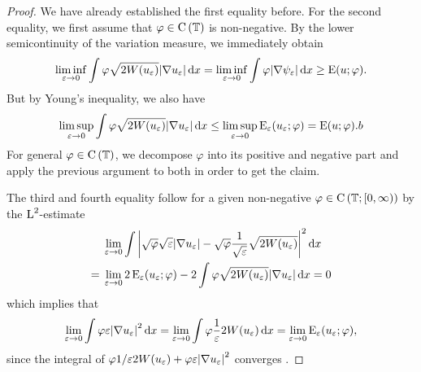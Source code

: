 \begin{proof}
	We have already established the first equality before. For the second 
	equality, we first assume that $ \varphi \in \operatorname{C} \left( \operatorname{\mathbb{T}}  
	\right) $ is non-negative.
	By the lower semicontinuity of the variation measure, we immediately obtain
	\begin{equation*}
		\liminf_{ \varepsilon \to 0 }
		\int
		\varphi
		\sqrt{ 2 W ( u_{ \varepsilon } ) }
		\abs{ \nabla u_{ \varepsilon } }
		\dd{ x }
		=
		\liminf_{ \varepsilon \to 0 }
			\int
				\varphi
				\abs{ \nabla \psi_{ \varepsilon } }
			\dd{ x }
		\geq
		\operatorname{E} ( u ; \varphi ).
	\end{equation*}
	But by Young's inequality, we also have 
	\begin{equation*}
		\limsup_{ \varepsilon \to 0 }
		\int
		\varphi
		\sqrt{ 2 W ( u_{ \varepsilon } ) }
		\abs{ \nabla u_{ \varepsilon } }
		\dd{ x }
		\leq
		\limsup_{ \varepsilon \to 0 }
		\operatorname{E}_{ \varepsilon } ( u_{ \varepsilon } ; \varphi )
		= \operatorname{E} ( u ; \varphi ).
b	\end{equation*}
	For general $ \varphi \in \operatorname{C} \left( \operatorname{\mathbb{T}} \right) $, we decompose $ 
	\varphi $ into its positive and negative part and apply the previous 
	argument to both in order to get the claim.
	
	The third and fourth equality follow for a given non-negative $ \varphi 
	\in \operatorname{C} \left( \operatorname{\mathbb{T}} ; [ 0 , \infty ) \right) $ by the 
	$ \operatorname{L}^{ 2 } $-estimate
	\begin{align*}
		& \lim_{ \varepsilon \to 0 }
		\int
		\abs{ \sqrt{ \varphi } \sqrt{ \varepsilon } \abs{ \nabla u_{ 
		\varepsilon } } - \sqrt{ \varphi } \frac{ 1 }{ \sqrt{ \varepsilon } } 
		\sqrt{ 2 W ( u_{ \varepsilon } ) } }^{ 2 }
		\dd{ x }
		\\
		={} &
		\lim_{ \varepsilon \to 0 }
		2 \operatorname{E}_{ \varepsilon } ( u_{ \varepsilon } ; \varphi )
		-
		2 \int	
		\varphi
		\sqrt{ 2 W ( u_{ \varepsilon } ) }
		\abs{ \nabla u_{ \varepsilon } }
		\dd{ x }
		=
		0
	\end{align*}
	which implies that 
	\begin{equation*}
		\lim_{ \varepsilon \to 0 }
		\int
		\varphi
		\varepsilon
		\abs{ \nabla u_{ \varepsilon } }^{ 2 }
		\dd{ x }
		=
		\lim_{ \varepsilon \to 0}
		\int
		\varphi
		\frac{ 1 }{ \varepsilon }
		2 W ( u_{ \varepsilon } )
		\dd{ x }
		=
		\lim_{ \varepsilon \to 0 }
		\operatorname{E}_{ \varepsilon } ( u_{ \varepsilon } ; \varphi ),
	\end{equation*}
	since the integral of $ \varphi 1/ \varepsilon 2 W ( u_{ \varepsilon } ) + 
	\varphi \varepsilon \abs{ \nabla u_{\varepsilon } }^{ 2 } $ converges .
\end{proof}

